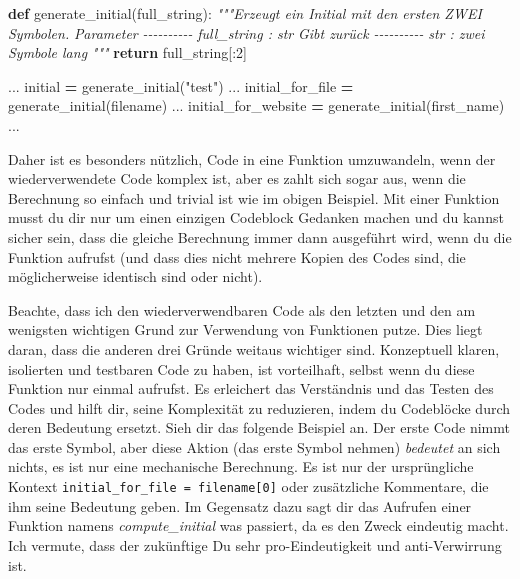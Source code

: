 \documentclass[
]{book}
\newenvironment{Shaded}{\begin{snugshade}}{\end{snugshade}}
\newcommand{\CommentTok}[1]{\textcolor[rgb]{0.56,0.35,0.01}{\textit{#1}}}
\newcommand{\ControlFlowTok}[1]{\textcolor[rgb]{0.13,0.29,0.53}{\textbf{#1}}}
\newcommand{\DecValTok}[1]{\textcolor[rgb]{0.00,0.00,0.81}{#1}}
\newcommand{\KeywordTok}[1]{\textcolor[rgb]{0.13,0.29,0.53}{\textbf{#1}}}
\newcommand{\NormalTok}[1]{#1}
\newcommand{\OperatorTok}[1]{\textcolor[rgb]{0.81,0.36,0.00}{\textbf{#1}}}
\newcommand{\StringTok}[1]{\textcolor[rgb]{0.31,0.60,0.02}{#1}}
\begin{document}
\begin{Shaded}
\begin{Highlighting}[]
\KeywordTok{def}\NormalTok{ generate\_initial(full\_string):}
    \CommentTok{"""Erzeugt ein Initial mit den ersten ZWEI Symbolen.}
\CommentTok{    }
\CommentTok{    Parameter}
\CommentTok{    {-}{-}{-}{-}{-}{-}{-}{-}{-}{-}}
\CommentTok{    full\_string : str}
\CommentTok{    }
\CommentTok{    Gibt zurück}
\CommentTok{    {-}{-}{-}{-}{-}{-}{-}{-}{-}{-}}
\CommentTok{    str : zwei Symbole lang}
\CommentTok{    """}
    \ControlFlowTok{return}\NormalTok{ full\_string[:}\DecValTok{2}\NormalTok{]}

\NormalTok{...}
\NormalTok{initial }\OperatorTok{=}\NormalTok{ generate\_initial(}\StringTok{"test"}\NormalTok{)}
\NormalTok{...}
\NormalTok{initial\_for\_file }\OperatorTok{=}\NormalTok{ generate\_initial(filename)}
\NormalTok{...}
\NormalTok{initial\_for\_website }\OperatorTok{=}\NormalTok{ generate\_initial(first\_name)}
\NormalTok{...}
\end{Highlighting}
\end{Shaded}

Daher ist es besonders nützlich, Code in eine Funktion umzuwandeln, wenn der wiederverwendete Code komplex ist, aber es zahlt sich sogar aus, wenn die Berechnung so einfach und trivial ist wie im obigen Beispiel. Mit einer Funktion musst du dir nur um einen einzigen Codeblock Gedanken machen und du kannst sicher sein, dass die gleiche Berechnung immer dann ausgeführt wird, wenn du die Funktion aufrufst (und dass dies nicht mehrere Kopien des Codes sind, die möglicherweise identisch sind oder nicht).

Beachte, dass ich den wiederverwendbaren Code als den letzten und den am wenigsten wichtigen Grund zur Verwendung von Funktionen putze. Dies liegt daran, dass die anderen drei Gründe weitaus wichtiger sind. Konzeptuell klaren, isolierten und testbaren Code zu haben, ist vorteilhaft, selbst wenn du diese Funktion nur einmal aufrufst. Es erleichert das Verständnis und das Testen des Codes und hilft dir, seine Komplexität zu reduzieren, indem du Codeblöcke durch deren Bedeutung ersetzt. Sieh dir das folgende Beispiel an. Der erste Code nimmt das erste Symbol, aber diese Aktion (das erste Symbol nehmen) \emph{bedeutet} an sich nichts, es ist nur eine mechanische Berechnung. Es ist nur der ursprüngliche Kontext \texttt{initial\_for\_file\ =\ filename{[}0{]}} oder zusätzliche Kommentare, die ihm seine Bedeutung geben. Im Gegensatz dazu sagt dir das Aufrufen einer Funktion namens \emph{compute\_initial} was passiert, da es den Zweck eindeutig macht. Ich vermute, dass der zukünftige Du sehr pro-Eindeutigkeit und anti-Verwirrung ist.
\end{document}
